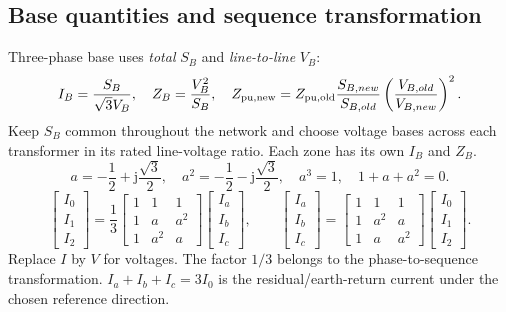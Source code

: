 \documentclass[11pt,a4paper]{article}
\newenvironment{Idea}[1]{\begin{tcolorbox}[colback=pale,colframe=teal,coltitle=white,title={#1}]}{\end{tcolorbox}}
\newcommand{\jj}{\mathrm j}
\begin{document}
\subsection{Base quantities and sequence transformation}
\begin{Idea}{Keep these conventions on every calculation page}
Three-phase base uses \emph{total} $S_B$ and \emph{line-to-line} $V_B$:
\[
 I_B=\frac{S_B}{\sqrt3V_B},\quad Z_B=\frac{V_B^2}{S_B},\quad
 Z_{\rm pu,new}=Z_{\rm pu,old}\frac{S_{B,new}}{S_{B,old}}
 \left(\frac{V_{B,old}}{V_{B,new}}\right)^2.
\]
Keep $S_B$ common throughout the network and choose voltage bases across each transformer in its rated line-voltage ratio. Each zone has its own $I_B$ and $Z_B$.
\[
 a=-\frac12+\jj\frac{\sqrt3}{2},\quad a^2=-\frac12-\jj\frac{\sqrt3}{2},\quad
 a^3=1,\quad 1+a+a^2=0.
\]
\[
 \begin{bmatrix}I_0\\I_1\\I_2\end{bmatrix}
 =\frac13\begin{bmatrix}1&1&1\\1&a&a^2\\1&a^2&a\end{bmatrix}
 \begin{bmatrix}I_a\\I_b\\I_c\end{bmatrix},\qquad
 \begin{bmatrix}I_a\\I_b\\I_c\end{bmatrix}
 =\begin{bmatrix}1&1&1\\1&a^2&a\\1&a&a^2\end{bmatrix}
 \begin{bmatrix}I_0\\I_1\\I_2\end{bmatrix}.
\]
Replace $I$ by $V$ for voltages. The factor $1/3$ belongs to the phase-to-sequence transformation. $I_a+I_b+I_c=3I_0$ is the residual/earth-return current under the chosen reference direction.
\end{Idea}
\end{document}
